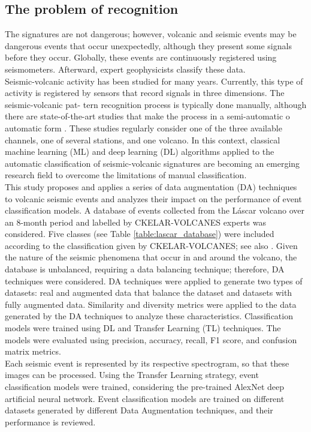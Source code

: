 \documentclass[journal]{IEEEtran}
\begin{document}
\subsection{The problem of recognition}
The signatures are not dangerous; however, volcanic and seismic events may be dangerous events that occur unexpectedly, although they present some signals before they occur. Globally, these events are continuously registered using seismometers. Afterward, expert geophysicists classify these data.\\
Seismic-volcanic activity has been studied for many years. Currently, this type of activity is registered by sensors that record signals in three dimensions. The seismic-volcanic pat- tern recognition process is typically done manually, although there are state-of-the-art studies that make the process in a semi-automatic o automatic form \cite{salazar2022multi,salazar2020deep,malfante2018automatic,bicego2012classification,curilem2016pattern, lara2020automatic}. These studies regularly consider one of the three available channels, one of several stations, and one volcano. In this context, classical machine learning (ML) and deep learning (DL) algorithms applied to the automatic classification of seismic-volcanic signatures are becoming an emerging research field to overcome the limitations of manual classification.\\
This study proposes and applies a series of data augmentation (DA) techniques to volcanic seismic events and analyzes their impact on the performance of event classification models. A database of events collected from the Láscar volcano over  an 8-month period and labelled by CKELAR-VOLCANES experts was considered. Five classes (see Table \ref{table:lascar_database}) were included according to the classification given by CKELAR-VOLCANES; see also \cite{salazar2022multi}. Given the nature of the seismic phenomena that occur in and around the volcano, the database is unbalanced, requiring a data balancing technique; therefore, DA techniques were considered. DA techniques were applied to generate two types of datasets: real and augmented data that balance the dataset and datasets with fully augmented data. Similarity and diversity metrics were applied to the data generated by the DA techniques to analyze these characteristics. Classification models were trained using DL and Transfer Learning (TL) techniques. The models were evaluated using precision, accuracy, recall, F1 score, and confusion matrix metrics. \\
Each seismic event is represented by its respective spectrogram, so that these images can be processed. Using the Transfer Learning strategy, event classification models were trained, considering the pre-trained AlexNet deep artificial neural network. Event classification models are trained on different datasets generated by different Data Augmentation techniques, and their performance is reviewed. \\
\end{document}
